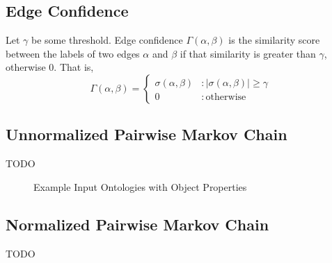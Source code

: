 \documentclass[letterpaper,twocolumn,12pt]{article}
\begin{document}
\subsection{Edge Confidence}

\begin{defn}
Let $\gamma$ be some threshold. Edge confidence $\Gamma \left( \alpha, \beta \right)$ is the similarity score between the labels of two edges $\alpha$ and $\beta$ if that similarity is greater than $\gamma$, otherwise $0$. That is,
$$ \Gamma \left( \alpha, \beta \right) = \left\{
   	 \begin{array}{ll}
       \sigma \left( \alpha, \beta \right) & : \vert \sigma \left( \alpha, \beta \right) \vert \geq \gamma \\
       0                                   & : \mathrm{otherwise}
     \end{array}
   \right.$$
\end{defn}

\subsection{Unnormalized Pairwise Markov Chain}
TODO

\begin{figure*}
\centering
\SetVertexNormal[
	Shape = circle,
    LineWidth = 1pt
]
\SetUpEdge[
	lw = 1pt,
    color = orange,
    labelcolor = white
]
\caption{Example Input Ontologies with Object Properties}
\end{figure*}

\subsection{Normalized Pairwise Markov Chain}
TODO
\end{document}
